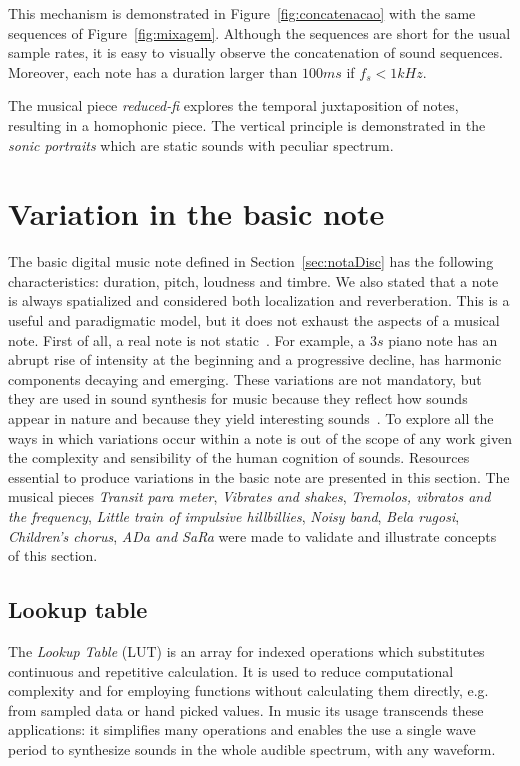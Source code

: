 This mechanism is demonstrated in Figure~\ref{fig:concatenacao} with the same sequences of Figure~\ref{fig:mixagem}.
Although the sequences are short for the usual sample rates, it is easy to visually observe the concatenation of sound sequences.
Moreover, each note has  a duration larger than $100ms$ if $f_s<1kHz$.

The musical piece \emph{reduced-fi} explores the temporal juxtaposition of notes, resulting in a homophonic piece.
The vertical principle is demonstrated in the \emph{sonic portraits} which are static sounds with peculiar spectrum.\cite{MASSA}



\section{Variation in the basic note}\label{sec:internalVar}\label{sec:varInternas}
The basic digital music note defined in Section~\ref{sec:notaDisc} has the following characteristics: duration, pitch, loudness and timbre.
We also stated that a note is always spatialized and considered both localization and reverberation.
This is a useful and paradigmatic model, but it does not exhaust the aspects of a musical note.
First of all, a real note is not static~\cite{Chowning}.
For example, a $3s$ piano note has an abrupt rise of intensity at the beginning and a progressive decline,
has harmonic components decaying and emerging.
These variations are not mandatory, but they are used in sound synthesis for music because 
they reflect how sounds appear in nature and because they yield interesting sounds~\cite{Roederer}.
To explore all the ways in which variations occur within a note is out of the scope of any work given
the complexity and sensibility of the human cognition of sounds.
Resources essential to produce variations in the basic note are presented in this section.
The musical pieces \emph{Transit para meter}, \emph{Vibrates and shakes}, \emph{Tremolos, vibratos and the frequency}, \emph{Little train of impulsive hillbillies}, \emph{Noisy band}, \emph{Bela rugosi}, \emph{Children's chorus}, \emph{ADa and SaRa} were made to validate and illustrate concepts of this section.~\cite{MASSA}
 
\subsection{Lookup table}\label{subsec:lookup}
The \emph{Lookup Table} (LUT) is an array for indexed operations which substitutes continuous and repetitive calculation. It is used to reduce computational complexity and for employing functions without calculating them directly, e.g. from sampled data or hand picked values.
In music its usage transcends these applications: it simplifies many operations and enables the use a single wave period to synthesize sounds in the whole audible spectrum, with any waveform.

